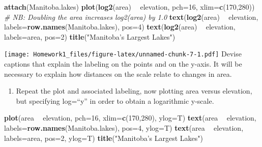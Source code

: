 \documentclass[hyperref,]{ctexart}
\newenvironment{Shaded}{\begin{snugshade}}{\end{snugshade}}
\newcommand{\CommentTok}[1]{\textcolor[rgb]{0.56,0.35,0.01}{\textit{#1}}}
\newcommand{\DataTypeTok}[1]{\textcolor[rgb]{0.13,0.29,0.53}{#1}}
\newcommand{\DecValTok}[1]{\textcolor[rgb]{0.00,0.00,0.81}{#1}}
\newcommand{\KeywordTok}[1]{\textcolor[rgb]{0.13,0.29,0.53}{\textbf{#1}}}
\newcommand{\NormalTok}[1]{#1}
\newcommand{\OperatorTok}[1]{\textcolor[rgb]{0.81,0.36,0.00}{\textbf{#1}}}
\newcommand{\StringTok}[1]{\textcolor[rgb]{0.31,0.60,0.02}{#1}}
\providecommand{\tightlist}{%
  \setlength{\itemsep}{0pt}\setlength{\parskip}{0pt}}
\begin{document}
\begin{Shaded}
\begin{Highlighting}[]
\KeywordTok{attach}\NormalTok{(Manitoba.lakes)}
\KeywordTok{plot}\NormalTok{(}\KeywordTok{log2}\NormalTok{(area) }\OperatorTok{~}\StringTok{ }\NormalTok{elevation, }\DataTypeTok{pch=}\DecValTok{16}\NormalTok{, }\DataTypeTok{xlim=}\KeywordTok{c}\NormalTok{(}\DecValTok{170}\NormalTok{,}\DecValTok{280}\NormalTok{))}
\CommentTok{# NB: Doubling the area increases log2(area) by 1.0}
\KeywordTok{text}\NormalTok{(}\KeywordTok{log2}\NormalTok{(area) }\OperatorTok{~}\StringTok{ }\NormalTok{elevation, }\DataTypeTok{labels=}\KeywordTok{row.names}\NormalTok{(Manitoba.lakes), }\DataTypeTok{pos=}\DecValTok{4}\NormalTok{)}
\KeywordTok{text}\NormalTok{(}\KeywordTok{log2}\NormalTok{(area) }\OperatorTok{~}\StringTok{ }\NormalTok{elevation, }\DataTypeTok{labels=}\NormalTok{area, }\DataTypeTok{pos=}\DecValTok{2}\NormalTok{) }
\KeywordTok{title}\NormalTok{(}\StringTok{"Manitoba’s Largest Lakes"}\NormalTok{)}
\end{Highlighting}
\end{Shaded}

\texttt{[image: Homework1\_files/figure-latex/unnamed-chunk-7-1.pdf]}
Devise captions that explain the labeling on the points and on the
y-axis. It will be necessary to explain how distances on the scale
relate to changes in area.

\begin{enumerate}
\def\labelenumi{(\alph{enumi})}
\setcounter{enumi}{1}
\tightlist
\item
  Repeat the plot and associated labeling, now plotting area versus
  elevation, but specifying log=``y'' in order to obtain a logarithmic
  y-scale.
\end{enumerate}

\begin{Shaded}
\begin{Highlighting}[]
\KeywordTok{plot}\NormalTok{(area }\OperatorTok{~}\StringTok{ }\NormalTok{elevation, }\DataTypeTok{pch=}\DecValTok{16}\NormalTok{, }\DataTypeTok{xlim=}\KeywordTok{c}\NormalTok{(}\DecValTok{170}\NormalTok{,}\DecValTok{280}\NormalTok{), }\DataTypeTok{ylog=}\NormalTok{T)}
\KeywordTok{text}\NormalTok{(area }\OperatorTok{~}\StringTok{ }\NormalTok{elevation, }\DataTypeTok{labels=}\KeywordTok{row.names}\NormalTok{(Manitoba.lakes), }\DataTypeTok{pos=}\DecValTok{4}\NormalTok{, }\DataTypeTok{ylog=}\NormalTok{T)}
\KeywordTok{text}\NormalTok{(area }\OperatorTok{~}\StringTok{ }\NormalTok{elevation, }\DataTypeTok{labels=}\NormalTok{area, }\DataTypeTok{pos=}\DecValTok{2}\NormalTok{, }\DataTypeTok{ylog=}\NormalTok{T) }
\KeywordTok{title}\NormalTok{(}\StringTok{"Manitoba’s Largest Lakes"}\NormalTok{)}
\end{Highlighting}
\end{Shaded}
\end{document}
